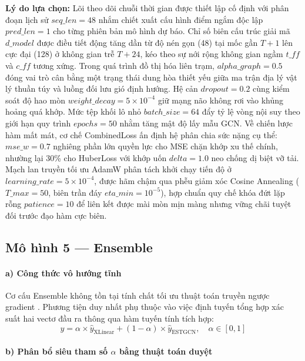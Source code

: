 \textbf{Lý do lựa chọn:} Lõi theo dõi chuỗi thời gian được thiết lập cố định với phân đoạn lịch sử $seq\_len=48$ nhắm chiết xuất cấu hình điểm ngắm độc lập $pred\_len=1$ cho từng phiên bản mô hình dự báo. Chỉ số biên cấu trúc giải mã $d\_model$ được điều tiết động tăng dần từ độ nén gọn (48) tại mốc gần $T+1$ lên cực đại (128) ở không gian trễ $T+24$, kéo theo sự nới rộng không gian ngầm $t\_ff$ và $c\_ff$ tương xứng. Trong quá trình đồ thị hóa liên trạm, $alpha\_graph=0.5$ đóng vai trò cân bằng một trạng thái dung hòa thiết yếu giữa ma trận địa lý vật lý thuần túy và luồng đối lưu gió định hướng. Hệ cản $dropout=0.2$ cùng kiểm soát độ hao mòn $weight\_decay=5 \times 10^{-4}$ giữ mạng não không rơi vào khủng hoảng quá khớp. Mức tệp khối lô nhỏ $batch\_size=64$ đẩy tỷ lệ vòng nội suy theo giới hạn quy trình $epochs=50$ nhằm tăng mật độ lấy mẫu GCN. Về chiến lược hàm mất mát, cơ chế CombinedLoss ấn định hệ phân chia sức nặng cụ thể: $mse\_w=0.7$ nghiêng phần lớn quyền lực cho MSE chặn khớp xu thế chính, nhường lại 30\% cho HuberLoss với khớp uốn $delta=1.0$ neo chống dị biệt vỡ tải. Mạch lan truyền tối ưu AdamW phân tách khởi chạy tiến độ ở $learning\_rate=5 \times 10^{-4}$, được hãm chậm qua phễu giảm xóc Cosine Annealing ($T\_max=50$, biên trần đáy $eta\_min=10^{-5}$), hợp chuẩn quy chế khóa đứt lặp rỗng $patience=10$ để liên kết được mài mòn mịn màng nhưng vững chãi tuyệt đối trước đạo hàm cực biên.

\subsection{Mô hình 5 --- Ensemble}

\paragraph{a) Công thức vô hướng tĩnh}

Cơ cấu Ensemble không tồn tại tính chất tối ưu thuật toán truyền ngược gradient . Phương tiện duy nhất phụ thuộc vào việc định tuyến tổng hợp xác suất hai vectơ đầu ra thông qua hàm tuyến tính tích hợp:
\begin{equation}
    \hat{y} = \alpha \times \hat{y}_{\text{XLinear}} + (1 - \alpha) \times \hat{y}_{\text{ESTGCN}}, \quad \alpha \in [0, 1]
\end{equation}

\paragraph{b) Phân bổ siêu tham số $\alpha$ bằng thuật toán duyệt}

